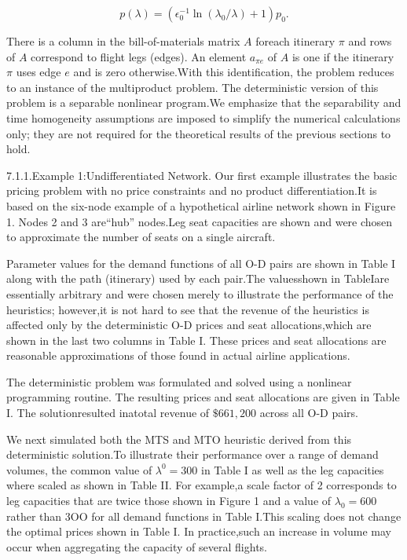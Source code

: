 \[
p ( \lambda ) = ( \epsilon _ { 0 } ^ { - 1 } \ln ( \lambda _ { 0 } / \lambda ) + 1 ) p _ { 0 } .
\]

There is a column in the bill-of-materials matrix \(A\) foreach
itinerary \(\pi\) and rows of \(A\) correspond to flight legs (edges).
An element \(\scriptstyle a _ { \pi e }\) of \(A\) is one if the
itinerary \(\pi\) uses edge \(e\) and is zero otherwise.With this
identification, the problem reduces to an instance of the multiproduct
problem. The deterministic version of this problem is a separable
nonlinear program.We emphasize that the separability and time
homogeneity assumptions are imposed to simplify the numerical
calculations only; they are not required for the theoretical results of
the previous sections to hold.

7.1.1.Example 1:Undifferentiated Network. Our first example illustrates
the basic pricing problem with no price constraints and no product
differentiation.It is based on the six-node example of a hypothetical
airline network shown in Figure 1. Nodes 2 and 3 are``hub'' nodes.Leg
seat capacities are shown and were chosen to approximate the number of
seats on a single aircraft.

Parameter values for the demand functions of all O-D pairs are shown in
Table I along with the path (itinerary) used by each pair.The
valuesshown in TableIare essentially arbitrary and were chosen merely to
illustrate the performance of the heuristics; however,it is not hard to
see that the revenue of the heuristics is affected only by the
deterministic O-D prices and seat allocations,which are shown in the
last two columns in Table I. These prices and seat allocations are
reasonable approximations of those found in actual airline applications.

The deterministic problem was formulated and solved using a nonlinear
programming routine. The resulting prices and seat allocations are given
in Table I. The solutionresulted inatotal revenue of \(\$ 661,200\)
across all O-D pairs.

We next simulated both the MTS and MTO heuristic derived from this
deterministic solution.To illustrate their performance over a range of
demand volumes, the common value of \(\lambda ^ { 0 } = 3 0 0\) in Table
I as well as the leg capacities where scaled as shown in Table II. For
example,a scale factor of 2 corresponds to leg capacities that are twice
those shown in Figure 1 and a value of \(\lambda _ { 0 } = 6 0 0\)
rather than 3OO for all demand functions in Table I.This scaling does
not change the optimal prices shown in Table I. In practice,such an
increase in volume may occur when aggregating the capacity of several
flights.


